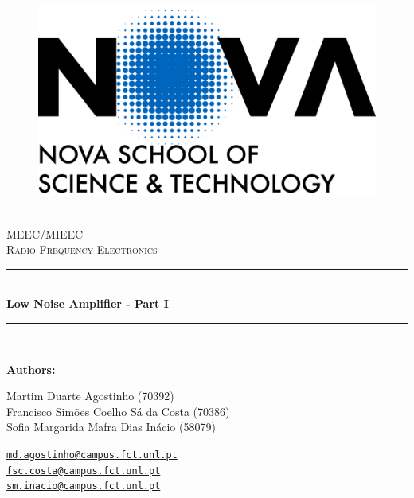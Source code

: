 \documentclass[12pt]{article}
\newcommand{\HRule}{\rule{\linewidth}{0.5mm}} %
\begin{document}

\begin{center}
    \begin{figure}
        \vspace{-1.0cm}
        \includegraphics[scale = 0.055, left]{Images/NovaFctVer.png} %
    \end{figure}

    \mbox{}\\[2.0cm]
    \textsc{\Huge MEEC/MIEEC}\\[2.5cm]
    \textsc{\LARGE Radio Frequency Electronics}\\[2.0cm]
    \HRule\\[0.4cm]
    {\large \bf {Low Noise Amplifier - Part I}}\\[0.2cm]
    \HRule\\[1.5cm]
\end{center}

\begin{flushleft}
    \textbf{Authors:}
\end{flushleft}

\begin{center}
    \begin{minipage}{0.5\textwidth}
        \begin{flushleft}
            Martim Duarte Agostinho (70392)\\
            Francisco Simões Coelho Sá da Costa   (70386)\\
            Sofia Margarida Mafra Dias Inácio (58079)\\
        \end{flushleft}
    \end{minipage}%
    \begin{minipage}{0.5\textwidth}
        \begin{flushright}
            \href{mailto:md.agostinho@campus.fct.unl.pt}{\texttt{md.agostinho@campus.fct.unl.pt}}\\
            \href{mailto:fsc.costa@campus.fct.unl.pt}{\texttt{fsc.costa@campus.fct.unl.pt}}\\
            \href{mailto:sm.inacio@campus.fct.unl.pt}{\texttt{sm.inacio@campus.fct.unl.pt}}
        \end{flushright}
    \end{minipage}
\end{center}
 
\end{document}
